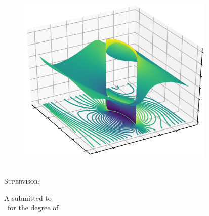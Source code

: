 \documentclass[../main.tex]{subfiles} %
\newcommand\TitleHUGE{\fontsize{34}{40}\selectfont} %
\begin{document}


\begin{titlepage} %
    \centering
    
    \textsc{\TitleHUGE{\Title}}\\
    
    \begin{figure}[ht!] %
        \begin{center}
            \includegraphics[height=8cm]{beforeText/frontpageImages/frontPageImage.PNG}
        \end{center}
    \end{figure} %
    
    \vfill
    
    \textsc{\huge{\Author}}\\\vspace{2em} %
    \textsc{\Large{Supervisor: \Supervisor}}\\\bigskip %
    
    \vfill
    
    A \MakeLowercase{\Doctype} submitted to\\
    \University\ for the degree of\\
    {\large\textsc{\Degree}\bigskip}\\
    

\end{titlepage}
\end{document}
